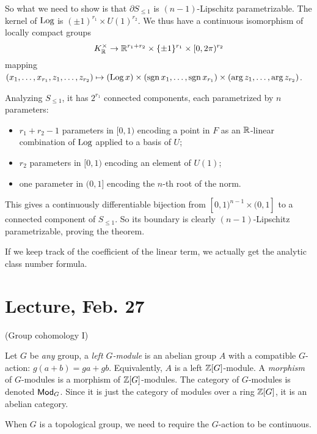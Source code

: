 \documentclass[11pt]{amsart}
\begin{document}
So what we need to show is that $\partial S_{\le 1}$ is $(n-1)$-Lipschitz parametrizable. The kernel of $\operatorname{Log}$ is $(\pm 1)^{r_1}\times U(1)^{r_2}$. We thus have a continuous isomorphism of locally compact groups
\[K_{\mathbb{R}}^\times \to \mathbb{R}^{r_1+r_2} \times \{\pm 1\}^{r_1} \times [0,2\pi)^{r_2}\]
mapping $(x_1,\dots,x_{r_1},z_1,\dots,z_{r_2}) \mapsto (\operatorname{Log} x) \times (\operatorname{sgn} x_1,\dots, \operatorname{sgn} x_{r_1})\times (\arg z_1,\dots,\arg z_{r_2})$.

Analyzing $S_{\le 1}$, it has $2^{r_1}$ connected components, each parametrized by $n$ parameters: 
\begin{itemize}
    \item $r_1+r_2-1$ parameters in $[0,1)$ encoding a point in $F$ as an $\mathbb{R}$-linear combination of $\operatorname{Log}$ applied to a basis of $U$;
    \item $r_2$ parameters in $[0,1)$ encoding an element of $U(1)$;
    \item one parameter in $(0,1]$ encoding the $n$-th root of the norm.
\end{itemize}
This gives a continuously differentiable bijection from $[0,1)^{n-1}\times (0,1]$ to a connected component of $S_{\le 1}$. So its boundary is clearly $(n-1)$-Lipschitz parametrizable, proving the theorem.

\begin{Rem}
    If we keep track of the coefficient of the linear term, we actually get the analytic class number formula.
\end{Rem}


\section{Lecture, Feb. 27}

(Group cohomology I)


\begin{defn}
    Let $G$ be \emph{any} group, a \emph{left $G$-module} is an abelian group $A$ with a compatible $G$-action: $g(a+b) = ga + gb$. Equivalently, $A$ is a left $\mathbb{Z}[G]$-module. A \emph{morphism} of $G$-modules is a morphism of $\mathbb{Z}[G]$-modules. The category of $G$-modules is denoted $\mathsf{Mod}_G$. Since it is just the category of modules over a ring $\mathbb{Z}[G]$, it is an abelian category.
\end{defn}

\begin{Rem}
    When $G$ is a topological group, we need to require the $G$-action to be continuous.
\end{Rem}
\end{document}
